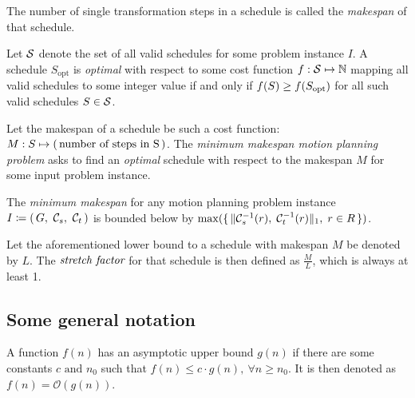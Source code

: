 \begin{definition}\label{def:makespan}
	The number of single transformation steps in a schedule is called the \emph{makespan} of that schedule.
\end{definition}

\begin{definition}\label{def:optimality}
	Let \(\mathcal{S}\) denote the set of all valid schedules for some problem instance \(I\). 
	A schedule \(S_\text{opt}\) is \emph{optimal} with respect to some cost function \(f : \mathcal{S} \mapsto \mathbb{N}\) mapping all valid schedules to some integer value if and only if \(f(S) \geq f(S_\text{opt})\) for all such valid schedules \(S \in \mathcal{S}\).
\end{definition}

\begin{definition}\label{def:m3pp}
	Let the makespan of a schedule be such a cost function: \(M : S \mapsto (\, \text{number of steps in S} \,)\). 
	The \emph{minimum makespan motion planning problem} asks to find an \emph{optimal} schedule with respect to the makespan \(M\) for some input problem instance.
\end{definition}

\begin{remark}
	The \emph{minimum makespan} for any motion planning problem instance \(I \coloneqq \parens{G,\ \conf{s},\ \conf{t}}\) is bounded below by \(\max(\set{\lVert\ensuremath{\mathcal{C}_{s}}^{-1}(r), \; \ensuremath{\mathcal{C}_{t}}^{-1}(r)\rVert_1, \; r \in R})\).
\end{remark}

\begin{definition}
	Let the aforementioned lower bound to a schedule with makespan \(M\) be denoted by \(L\). 
	The \(\emph{stretch factor}\) for that schedule is then defined as \(\frac{M}{L}\), which is always at least 1. 
\end{definition}

\subsection{Some general notation}

\begin{definition}
	A function \(f(n)\) has an asymptotic upper bound \(g(n)\) if there are some constants \(c \text{ and } n_0\) such that \(f(n) \leq c\cdot g(n),\ \forall n \geq n_0\). 
	It is then denoted as \(f(n) = \mathcal{O}(g(n))\). 
\end{definition}

